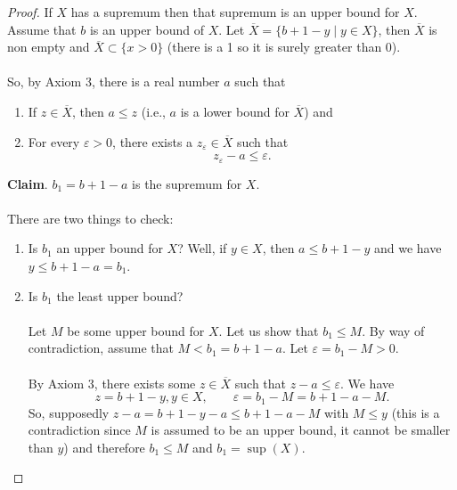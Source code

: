 \documentclass{article}
\newcommand{\set}[2]{\{ #1 \mid #2 \}}
\newcommand{\?}{\stackrel{?}{=}}
\theoremstyle{definition} %
\begin{document}
\begin{itemize}
\begin{theorem}
          \end{theorem}
          \begin{proof}
              If $X$ has a supremum then that supremum is an upper bound for $X$. Assume that $b$ is an upper bound of $X$. Let $\overline{X} = \set{b + 1 - y}{y \in X}$, then $\overline{X}$ is non empty and $\overline{X} \subset \{x > 0\}$ (there is a 1 so it is surely greater than 0). \\\\
              So, by Axiom 3, there is a real number $a$ such that
              \begin{enumerate}[label=(\arabic*)]
                  \item If $z \in \overline{X}$, then $a \leq z$ (i.e., $a$ is a lower bound for $\overline{X}$) and
                  \item For every $\varepsilon > 0$, there exists a $z_\varepsilon \in \overline{X}$ such that
                        $$z_\varepsilon - a \leq \varepsilon.$$
              \end{enumerate}
              \textbf{Claim}. $b_1 = b + 1 - a$ is the supremum for $X$. \\\\
              There are two things to check:
              \begin{enumerate}[label=(\arabic*)]
                  \item Is $b_1$ an upper bound for $X$? Well, if $y \in X$, then $a \leq b + 1 - y$ and we have $y \leq b + 1 - a = b_1$.
                  \item Is $b_1$ the least upper bound? \\\\
                        Let $M$ be some upper bound for $X$. Let us show that $b_1 \leq M$. By way of contradiction, assume that $M < b_1 = b + 1 - a$. Let $\varepsilon = b_1 - M > 0$. \\\\
                        By Axiom 3, there exists some $z \in \overline{X}$ such that $z - a \leq \varepsilon$. We have
                        $$z = b + 1 - y, y \in X, \qquad \varepsilon = b_1 - M = b + 1 - a - M.$$
                        So, supposedly $z - a = b + 1 - y - a \leq b + 1 - a - M$ with $M \leq y$ (this is a contradiction since $M$ is assumed to be an upper bound, it cannot be smaller than $y$) and therefore $b_1 \leq M$ and $b_1 = \sup(X)$.
              \end{enumerate}
          \end{proof}

\end{itemize}
\end{document}
